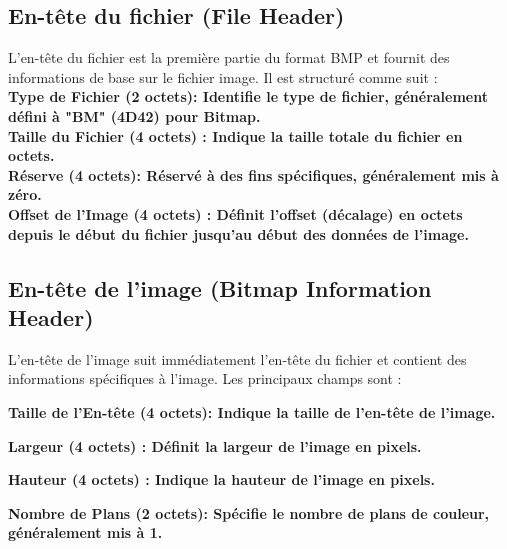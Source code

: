 \documentclass{article}
\begin{document}
\subsection{En-tête du fichier (File Header)}
L'en-tête du fichier est la première partie du format BMP et fournit des informations de base sur le fichier image. Il est structuré comme suit :\\

\bfseries Type de Fichier (2 octets)\normalfont : Identifie le type de fichier, généralement défini à "BM" (4D42) pour Bitmap.\\

\bfseries Taille du Fichier (4 octets) \normalfont : Indique la taille totale du fichier en octets.\\

\bfseries Réserve (4 octets)\normalfont : Réservé à des fins spécifiques, généralement mis à zéro.\\

\bfseries Offset de l'Image (4 octets) \normalfont : Définit l'offset (décalage) en octets depuis le début du fichier jusqu'au début des données de l'image.

\subsection{En-tête de l'image (Bitmap Information Header)}
L'en-tête de l'image suit immédiatement l'en-tête du fichier et contient des informations spécifiques à l'image. Les principaux champs sont :

\bfseries Taille de l'En-tête (4 octets)\normalfont : Indique la taille de l'en-tête de l'image.

\bfseries Largeur (4 octets) \normalfont : Définit la largeur de l'image en pixels.

\bfseries Hauteur (4 octets) \normalfont : Indique la hauteur de l'image en pixels.

\bfseries  Nombre de Plans (2 octets)\normalfont : Spécifie le nombre de plans de couleur, généralement mis à 1.
\end{document}
